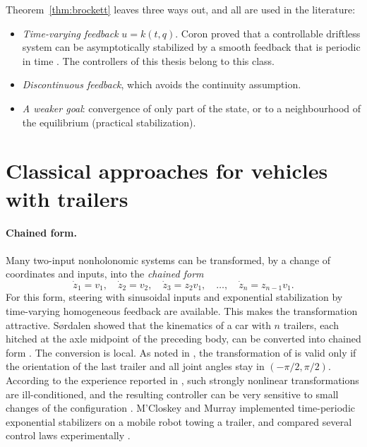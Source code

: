Theorem~\ref{thm:brockett} leaves three ways out, and all are used in the
literature:
\begin{itemize}
  \item \emph{Time-varying feedback} $u=k(t,q)$. Coron proved that a
        controllable driftless system can be asymptotically stabilized by a
        smooth feedback that is periodic in time \cite{coron1992}. The
        controllers of this thesis belong to this class.
  \item \emph{Discontinuous feedback}, which avoids the continuity assumption.
  \item \emph{A weaker goal}: convergence of only part of the state, or to a
        neighbourhood of the equilibrium (practical stabilization).
\end{itemize}

\section{Classical approaches for vehicles with trailers}
\label{sec:bg-classical}

\paragraph{Chained form.}
Many two-input nonholonomic systems can be transformed, by a change of
coordinates and inputs, into the \emph{chained form}
\begin{equation}
  \dot z_1=v_1,\quad \dot z_2=v_2,\quad \dot z_3=z_2v_1,\quad\dots,\quad
  \dot z_n=z_{n-1}v_1 .
  \label{eq:bg-chained}
\end{equation}
For this form, steering with sinusoidal inputs \cite{murray1993} and
exponential stabilization by time-varying homogeneous feedback
\cite{mccloskey1997} are available. This makes the transformation attractive.
Sørdalen showed that the kinematics of a car with $n$ trailers, each hitched at
the axle midpoint of the preceding body, can be converted into chained form
\cite{sordalen1993}. The conversion is local. As noted in
\cite{michalek2014tcst}, the transformation of \cite{sordalen1993} is valid
only if the orientation of the last trailer and all joint angles stay in
$(-\pi/2,\pi/2)$. According to the experience reported in
\cite{mccloskey1994}, such strongly nonlinear transformations are
ill-conditioned, and the resulting controller can be very sensitive to small
changes of the configuration \cite{michalek2014tcst}. M'Closkey and Murray
implemented time-periodic exponential stabilizers on a mobile robot towing a
trailer, and compared several control laws experimentally
\cite{mccloskey1994}.

